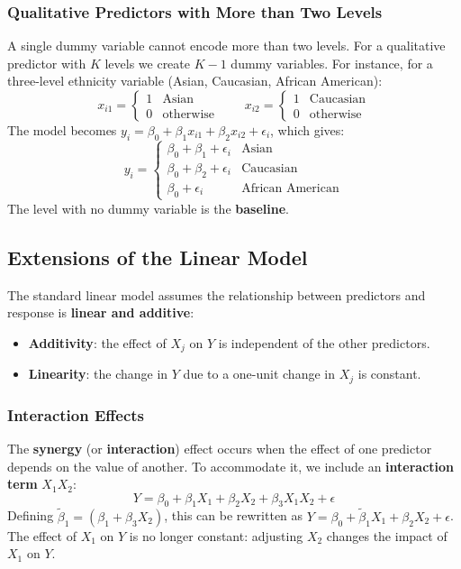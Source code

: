 \documentclass[11pt,a4paper]{article}
\theoremstyle{definition}
\theoremstyle{plain}
\theoremstyle{remark}
\begin{document}
\subsubsection{Qualitative Predictors with More than Two Levels}

A single dummy variable cannot encode more than two levels. For a qualitative predictor with $K$ levels we create $K-1$ dummy variables. For instance, for a three-level ethnicity variable (Asian, Caucasian, African American):
\[
    x_{i1} = \begin{cases} 1 & \text{Asian} \\ 0 & \text{otherwise} \end{cases}
    \qquad
    x_{i2} = \begin{cases} 1 & \text{Caucasian} \\ 0 & \text{otherwise} \end{cases}
\]
The model becomes $y_i = \beta_0 + \beta_1 x_{i1} + \beta_2 x_{i2} + \epsilon_i$, which gives:
\[
    y_i = \begin{cases} \beta_0 + \beta_1 + \epsilon_i & \text{Asian} \\ \beta_0 + \beta_2 + \epsilon_i & \text{Caucasian} \\ \beta_0 + \epsilon_i & \text{African American} \end{cases}
\]
The level with no dummy variable is the \textbf{baseline}.

\subsection{Extensions of the Linear Model}

The standard linear model assumes the relationship between predictors and response is \textbf{linear and additive}:
\begin{itemize}
    \item \textbf{Additivity}: the effect of $X_j$ on $Y$ is independent of the other predictors.
    \item \textbf{Linearity}: the change in $Y$ due to a one-unit change in $X_j$ is constant.
\end{itemize}

\subsubsection{Interaction Effects}

The \textbf{synergy} (or \textbf{interaction}) effect occurs when the effect of one predictor depends on the value of another. To accommodate it, we include an \textbf{interaction term} $X_1 X_2$:
\[
    Y = \beta_0 + \beta_1 X_1 + \beta_2 X_2 + \beta_3 X_1 X_2 + \epsilon
\]
Defining $\tilde{\beta}_1 = (\beta_1 + \beta_3 X_2)$, this can be rewritten as $Y = \beta_0 + \tilde{\beta}_1 X_1 + \beta_2 X_2 + \epsilon$. The effect of $X_1$ on $Y$ is no longer constant: adjusting $X_2$ changes the impact of $X_1$ on $Y$.
\end{document}
